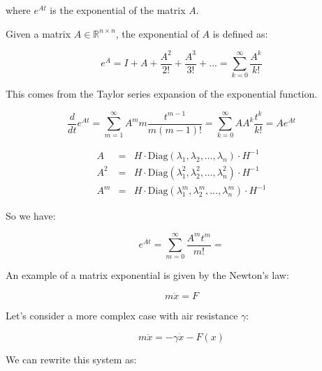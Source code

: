 where $e^{At}$ is the exponential of the matrix $A$.

\begin{definitionblock}
Given a matrix $A \in \mathbb{R}^{n \times n}$, the exponential of $A$ is defined as:

$$
e^A = I + A + \frac{A^2}{2!} + \frac{A^3}{3!} + \dots = \sum_{k=0}^{\infty} \frac{A^k}{k!}
$$

This comes from the Taylor series expansion of the exponential function.
\end{definitionblock}

$$
\dfrac d{dt} e^{At} = \sum_{m = 1}^\infty A^m m \dfrac{t^{m-1}}{m(m-1)!}
= \sum_{k = 0}^\infty A A^k \dfrac{t^k}{k!}
= A e^{At}
$$

$$
\begin{array}{lll}
A & = & H \cdot \text{Diag}(\lambda_1, \lambda_2, \dots, \lambda_n) \cdot H^{-1} \\
A^2 & = & H \cdot \text{Diag}(\lambda_1^2, \lambda_2^2, \dots, \lambda_n^2) \cdot H^{-1} \\
A^m & = & H \cdot \text{Diag}(\lambda_1^m, \lambda_2^m, \dots, \lambda_n^m) \cdot H^{-1}
\end{array}
$$

So we have:

$$
e^{At} = \sum_{m = 0} ^ \infty \dfrac{A^m t^m}{m!} = 
$$

\newpage

An example of a matrix exponential is given by the Newton's law:

$$
m \ddot x = F
$$

Let's consider a more complex case with air resistance $\gamma$:

$$
m \ddot x = - \gamma \dot x - F(x)
$$

We can rewrite this system as:

